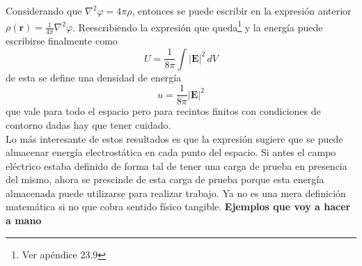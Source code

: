 \indent Considerando que $\nabla^{2}\varphi = 4\pi \rho$, entonces se puede escribir en la expresión anterior $\rho(\textbf{r}) = \frac{1}{4\pi}\nabla^{2}\varphi$. Reescribiendo la expresión que queda\footnote{Ver apéndice 23.9} y la energía puede escribirse finalmente como
\begin{equation*}
    U = \frac{1}{8\pi}\int |\textbf{E}|^{2}\,dV
\end{equation*}
de esta se define una densidad de energía
\begin{equation*}
    u = \frac{1}{8\pi}|\textbf{E}|^{2} 
\end{equation*}
que vale para todo el espacio pero para recintos finitos con condiciones de contorno dadas hay que tener cuidado.\\
\indent Lo más interesante de estos resultados es que la expresión sugiere que se puede almacenar energía electrostática en cada punto del espacio. Si antes el campo eléctrico estaba definido de forma tal de tener una carga de prueba en presencia del mismo, ahora se prescinde de esta carga de prueba porque esta energía almacenada puede utilizarse para realizar trabajo. Ya no es una mera definición matemática si no que cobra sentido físico tangible. 
\indent \textbf{Ejemplos que voy a hacer a mano}






